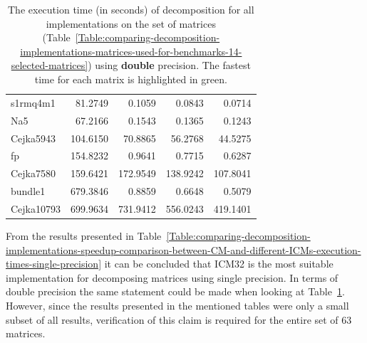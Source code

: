 \begin{table}[ht!]
\begin{tabular}{|>{\footnotesize}l|>{\raggedleft\arraybackslash\footnotesize}r|>{\raggedleft\arraybackslash\footnotesize}r|>{\raggedleft\arraybackslash\footnotesize}r|>{\raggedleft\arraybackslash\footnotesize}r|}
		s1rmq4m1        &                    81.2749 &                     0.1059 &                     0.0843 & \cellcolor{green!25}  0.0714 \\
		Na5             &                    67.2166 &                     0.1543 &                     0.1365 & \cellcolor{green!25}  0.1243 \\
		Cejka5943		&                   104.6150 &                    70.8865 &                    56.2768 & \cellcolor{green!25} 44.5275 \\
		fp              &                   154.8232 &                     0.9641 &                     0.7715 & \cellcolor{green!25}  0.6287 \\
		Cejka7580		&                   159.6421 &                   172.9549 &                   138.9242 & \cellcolor{green!25}107.8041 \\
		bundle1         &                   679.3846 &                     0.8859 &                     0.6648 & \cellcolor{green!25}  0.5079 \\
		Cejka10793      &                   699.9634 &                   731.9412 &                   556.0243 & \cellcolor{green!25}419.1401 \\ \hline
	\end{tabular}
	\caption{The execution time (in seconds) of decomposition for all implementations on the set of matrices (Table~\ref{Table:comparing-decomposition-implementations-matrices-used-for-benchmarks-14-selected-matrices}) using \textbf{double} precision. The fastest time for each matrix is highlighted in green.}
	\label{Table:comparing-decomposition-implementations-speedup-comparison-between-CM-and-different-ICMs-execution-times-double-precision}
\end{table}

From the results presented in Table~\ref{Table:comparing-decomposition-implementations-speedup-comparison-between-CM-and-different-ICMs-execution-times-single-precision} it can be concluded that ICM32 is the most suitable implementation for decomposing matrices using single precision. In terms of double precision the same statement could be made when looking at Table~\ref{Table:comparing-decomposition-implementations-speedup-comparison-between-CM-and-different-ICMs-execution-times-double-precision}. However, since the results presented in the mentioned tables were only a small subset of all results, verification of this claim is required for the entire set of 63 matrices.


